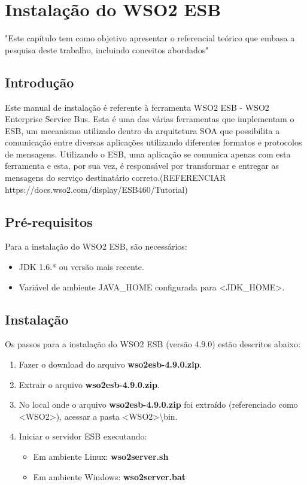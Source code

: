 \chapter[Instalação do WSO2 ESB]{Instalação do WSO2 ESB}
"Este capítulo tem como objetivo apresentar o referencial teórico que embasa a pesquisa deste trabalho, incluindo conceitos abordados"

\section{Introdução}
Este manual de instalação é referente à ferramenta WSO2 ESB - WSO2 Enterprise Service Bus. Esta é uma das várias ferramentas que implementam o ESB, um mecanismo utilizado dentro da arquitetura SOA que possibilita a comunicação entre diversas aplicações utilizando diferentes formatos e protocolos de mensagens. Utilizando o ESB, uma aplicação se comunica apenas com esta ferramenta e esta, por sua vez, é responsável por transformar e entregar as mensagens do serviço destinatário correto.(REFERENCIAR https://docs.wso2.com/display/ESB460/Tutorial)

\section{Pré-requisitos}
Para a instalação do WSO2 ESB, são necessários:
\begin{itemize}
\item JDK 1.6.* ou versão mais recente.
\item Variável de ambiente JAVA\_HOME configurada para <JDK\_HOME>.
\end{itemize}

\section{Instalação}
Os passos para a instalação do WSO2 ESB (versão 4.9.0) estão descritos abaixo:
\begin{enumerate}
\item Fazer o download do arquivo \textbf{wso2esb-4.9.0.zip}.
\item Extrair o arquivo \textbf{wso2esb-4.9.0.zip}.
\item No local onde o arquivo \textbf{wso2esb-4.9.0.zip} foi extraído (referenciado como <WSO2>), acessar a pasta <WSO2>\textbackslash bin.
\item Iniciar o servidor ESB executando:
\begin{itemize}
\item Em ambiente Linux: \textbf{wso2server.sh}
\item Em ambiente Windows: \textbf{wso2server.bat}
\end{itemize}
\end{enumerate}

